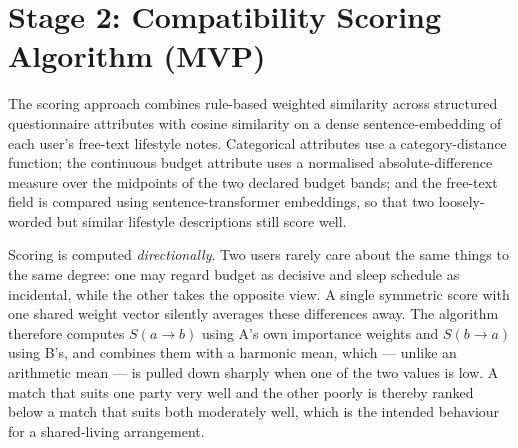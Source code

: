 \documentclass[12pt,a4paper]{report}
\begin{document}
\section{Stage 2: Compatibility Scoring Algorithm (MVP)}

The scoring approach combines rule-based weighted similarity across structured questionnaire attributes with cosine similarity on a dense sentence-embedding of each user's free-text lifestyle notes. Categorical attributes use a category-distance function; the continuous budget attribute uses a normalised absolute-difference measure over the midpoints of the two declared budget bands; and the free-text field is compared using sentence-transformer embeddings, so that two loosely-worded but similar lifestyle descriptions still score well.

Scoring is computed \emph{directionally}. Two users rarely care about the same things to the same degree: one may regard budget as decisive and sleep schedule as incidental, while the other takes the opposite view. A single symmetric score with one shared weight vector silently averages these differences away. The algorithm therefore computes $S(a \rightarrow b)$ using A's own importance weights and $S(b \rightarrow a)$ using B's, and combines them with a harmonic mean, which --- unlike an arithmetic mean --- is pulled down sharply when one of the two values is low. A match that suits one party very well and the other poorly is thereby ranked below a match that suits both moderately well, which is the intended behaviour for a shared-living arrangement.

\vspace{4mm}
\end{document}
